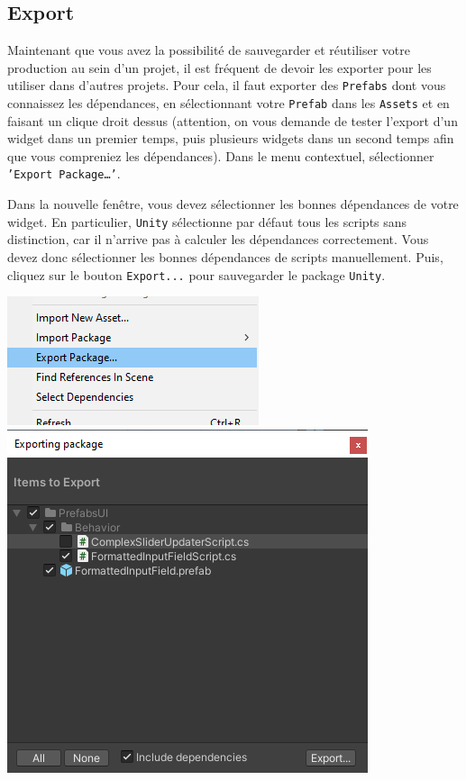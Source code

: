 \documentclass[a4paper,10pt]{article}
\begin{document}
\subsection{Export}

Maintenant que vous avez la possibilité de sauvegarder et réutiliser votre production au sein d'un projet, il est fréquent de devoir les exporter pour les utiliser dans d'autres projets. 
Pour cela, il faut exporter des \texttt{Prefabs} dont vous connaissez les dépendances, en sélectionnant votre \texttt{Prefab} dans les \texttt{Assets} et en faisant un clique droit dessus (attention, on vous demande de tester l'export d'un widget dans un premier temps, puis plusieurs widgets dans un second temps afin que vous compreniez les dépendances). Dans le menu contextuel, sélectionner \texttt{'Export Package\ldots'}.

Dans la nouvelle fenêtre, vous devez sélectionner les bonnes dépendances de votre widget. En particulier, \texttt{Unity} sélectionne par défaut tous les scripts sans distinction, car il n'arrive pas à calculer les dépendances correctement. Vous devez donc sélectionner les bonnes dépendances de scripts manuellement. Puis, cliquez sur le bouton \texttt{Export...} pour sauvegarder le package \texttt{Unity}.

\begin{center}
\hfill \includegraphics[width=0.35\linewidth]{rc/unity_set_ui_export_package}
\hfill \includegraphics[width=0.5\linewidth]{rc/unity_set_ui_export_prefab_deps}
\hfill 
\end{center}
\end{document}

